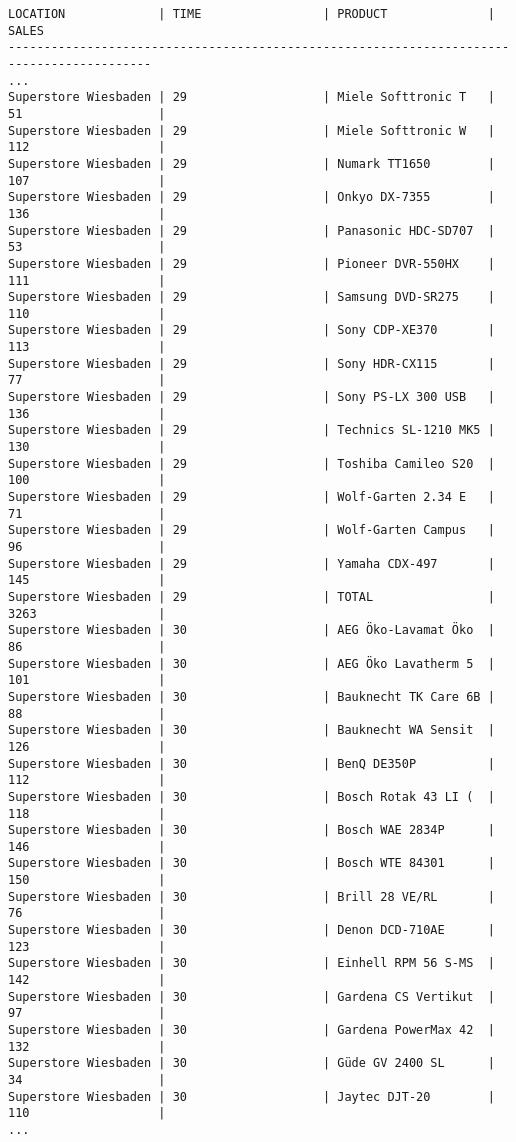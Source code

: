 \documentclass[a4paper,english,abstract=on]{scrartcl}
\begin{document}
\begin{lstlisting}
LOCATION             | TIME                 | PRODUCT              | SALES               
------------------------------------------------------------------------------------------
...
Superstore Wiesbaden | 29                   | Miele Softtronic T   | 51                   | 
Superstore Wiesbaden | 29                   | Miele Softtronic W   | 112                  | 
Superstore Wiesbaden | 29                   | Numark TT1650        | 107                  | 
Superstore Wiesbaden | 29                   | Onkyo DX-7355        | 136                  | 
Superstore Wiesbaden | 29                   | Panasonic HDC-SD707  | 53                   | 
Superstore Wiesbaden | 29                   | Pioneer DVR-550HX    | 111                  | 
Superstore Wiesbaden | 29                   | Samsung DVD-SR275    | 110                  | 
Superstore Wiesbaden | 29                   | Sony CDP-XE370       | 113                  | 
Superstore Wiesbaden | 29                   | Sony HDR-CX115       | 77                   | 
Superstore Wiesbaden | 29                   | Sony PS-LX 300 USB   | 136                  | 
Superstore Wiesbaden | 29                   | Technics SL-1210 MK5 | 130                  | 
Superstore Wiesbaden | 29                   | Toshiba Camileo S20  | 100                  | 
Superstore Wiesbaden | 29                   | Wolf-Garten 2.34 E   | 71                   | 
Superstore Wiesbaden | 29                   | Wolf-Garten Campus   | 96                   | 
Superstore Wiesbaden | 29                   | Yamaha CDX-497       | 145                  | 
Superstore Wiesbaden | 29                   | TOTAL                | 3263                 | 
Superstore Wiesbaden | 30                   | AEG Öko-Lavamat Öko  | 86                   | 
Superstore Wiesbaden | 30                   | AEG Öko Lavatherm 5  | 101                  | 
Superstore Wiesbaden | 30                   | Bauknecht TK Care 6B | 88                   | 
Superstore Wiesbaden | 30                   | Bauknecht WA Sensit  | 126                  | 
Superstore Wiesbaden | 30                   | BenQ DE350P          | 112                  | 
Superstore Wiesbaden | 30                   | Bosch Rotak 43 LI (  | 118                  | 
Superstore Wiesbaden | 30                   | Bosch WAE 2834P      | 146                  | 
Superstore Wiesbaden | 30                   | Bosch WTE 84301      | 150                  | 
Superstore Wiesbaden | 30                   | Brill 28 VE/RL       | 76                   | 
Superstore Wiesbaden | 30                   | Denon DCD-710AE      | 123                  | 
Superstore Wiesbaden | 30                   | Einhell RPM 56 S-MS  | 142                  | 
Superstore Wiesbaden | 30                   | Gardena CS Vertikut  | 97                   | 
Superstore Wiesbaden | 30                   | Gardena PowerMax 42  | 132                  | 
Superstore Wiesbaden | 30                   | Güde GV 2400 SL      | 34                   | 
Superstore Wiesbaden | 30                   | Jaytec DJT-20        | 110                  | 
...
\end{lstlisting}
\end{document}
